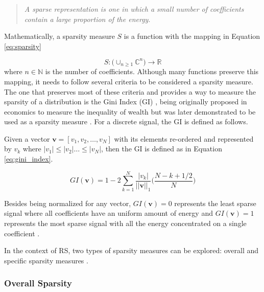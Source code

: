     \begin{quote}
        \textit{A sparse representation is one in which a small number of coefficients contain a large proportion of the energy}.    
    \end{quote}
     
    Mathematically, a sparsity measure $S$ is a function with the mapping in Equation \ref{eq:sparsity}
     
    \begin{equation}
        \label{eq:sparsity}
        S: \bigg( \cup_{n \geq 1} \mathbb{C}^n \bigg) \rightarrow \mathbb{R}
    \end{equation} where $n \in \mathbb{N}$ is the number of coefficients. Although many functions preserve this mapping, it needs to follow several criteria to be considered a sparsity measure. The one that preserves most of these criteria and provides a way to measure the sparsity of a distribution is the Gini Index (GI)  \cite{10.2307/2223525}, being originally proposed in economics to measure the inequality of wealth but was later demonstrated to be used as a sparsity measure \cite{2006SparseSources, 2004GiniIndexSpeech}. For a discrete signal, the GI is defined as follows.
    
    Given a vector $\textbf{v} = [v_1, v_2, \ldots, v_N]$ with its elements re-ordered and represented by $v_k$ where $|v_1| \leq |v_2| \ldots \leq |v_N|$, then the GI is defined as in Equation \ref{eq:gini_index}.
     
    \begin{equation}
        \label{eq:gini_index}
        GI(\textbf{v}) = 1 - 2\sum_{k=1}^{N} \frac{|v_k|}{||\textbf{v}||_1} \bigg( \frac{N-k+1/2}{N} \bigg)
    \end{equation}
     
    Besides being normalized for any vector, $GI(\textbf{v}) = 0$ represents the least sparse signal where all coefficients have an uniform amount of energy and $GI(\textbf{v}) = 1$ represents the most sparse signal with all the energy concentrated on a single coefficient \cite{10.1109/TIT.2009.2027527}. 
     
    In the context of RS, two types of sparsity measures can be explored: overall and specific sparsity measures \cite{10.1016/j.eswa.2010.09.141}.
    
    \subsubsection{Overall Sparsity} 

